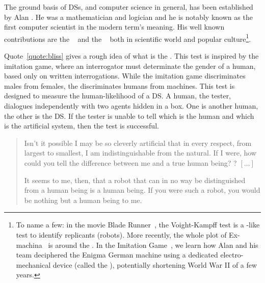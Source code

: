 The ground basis of \glspl{DS}, and computer science in general, has been established by Alan . He was a mathematician and logician and he is notably known as the first computer scientist in the modern term's meaning. His well known contributions are the ~\parencite{turing-maching} and the ~\parencite{turing-test} both in scientific world and popular culture\footnote{To name a few: in the movie Blade Runner~\parencite{blade-runner}, the Voight-Kampff test is a -like test to identify replicants (robots). More recently, the whole plot of Ex-machina~\parencite{ex-machina} is around the . In the Imitation Game~\parencite{imitation-game}, we learn how Alan  and his team deciphered the Enigma German machine using a dedicated electro-mechanical device (called the
), potentially shortening World War II of a few years.}.

Quote~\ref{quote:bliss} gives a rough idea of what is the . This test is inspired by the imitation game, where an interrogator must determinate the gender of a human, based only on written interrogations. While the imitation game discriminates males from females, the  discriminates humans from machines. This test is designed to measure the human-likelihood of a \gls{DS}. A human, the tester, dialogues independently with two agents hidden in a box. One  is another human, the other is the \gls{DS}. If the tester is unable to tell which is the human and which is the artificial system, then the test is successful.


\begin{quote}{
\begin{description}[noitemsep = 0pt]%
    \item[Bliss:]  Isn't it possible I may be so cleverly artificial that in every respect, from largest to smallest, I am indistinguishable from the natural. If I were, how could you tell the difference between me and a true human being? ? $[\dots]$

    \item[Janov:] It seems to me, then, that a robot that can in no way be distinguished from a human being is a human being. If you were such a robot, you would be nothing but a human being to me.

\end{description}}
    \label{quote:bliss}
\end{quote}

